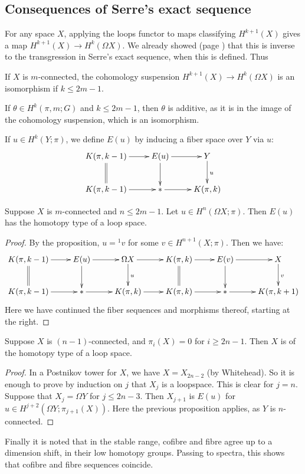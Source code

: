 \documentclass[11pt]{article}
\begin{document}
\subsection{Consequences of Serre's exact sequence}
For any space $X$, applying the loops functor to maps classifying $H^{k+1}(X)$
gives a map $H^{k+1}(X)\to H^{k}(\Omega X)$. We already showed (page
\pageref{cohSusp}) that this is inverse to the transgression in Serre's exact
sequence, when this is defined. Thus
\begin{prop*}
If $X$ is $m$-connected, the cohomology suspension 
$H^{k+1}(X)\to H^{k}(\Omega X)$ is an isomorphism if $k\leq 2m-1$.
\end{prop*}
\begin{cor*}
If $\theta\in H^k(\pi,m;G)$ and $k\leq2m-1$, then $\theta$ is additive, as it is
in the image of the cohomology suspension, which is an isomorphism.
\end{cor*}
If $u\in H^k(Y;\pi)$, we define $E(u)$ by inducing a fiber space over $Y$ via
$u$:
\[\xymatrix{
K(\pi,k-1)\ar[r]\ar@{=}[d]&E(u)\ar[r]\ar[d]&Y\ar[d]^u\\
K(\pi,k-1)\ar[r]&{*}\ar[r]&K(\pi,k)
}\]
\begin{prop*}
Suppose $X$ is $m$-connected and $n\leq 2m-1$. Let $u\in H^n(\Omega X;\pi)$.
Then $E(u)$ has the homotopy type of a loop space.
\end{prop*}
\begin{proof}
By the proposition, $u={^1v}$ for some $v\in H^{n+1}(X;\pi)$. Then we have:
\[\xymatrix{
K(\pi,k-1)\ar[r]\ar@{=}[d]&E(u)\ar[r]\ar[d]&\Omega X\ar[d]^u\ar[r]&
K(\pi,k)\ar[r]\ar@{=}[d]&E(v)\ar[r]\ar[d]&X\ar[d]^v\\
K(\pi,k-1)\ar[r]&{*}\ar[r]&K(\pi,k)\ar[r]&
K(\pi,k)\ar[r]&{*}\ar[r]&K(\pi,k+1)
}\]
Here we have continued the fiber sequences and morphisms thereof, starting at
the right.
\end{proof}
\begin{cor*}
Suppose $X$ is $(n-1)$-connected, and $\pi_i(X)=0$ for $i\geq 2n-1$. Then $X$ is
of the homotopy type of a loop space.
\end{cor*}
\begin{proof}
In a Postnikov tower for $X$, we have $X=X_{2n-2}$ (by Whitehead). So it is
enough to prove by induction on $j$ that $X_{j}$ is a loopspace. This is clear
for $j=n$. Suppose that $X_{j}=\Omega Y$ for $j\leq 2n-3$. Then $X_{j+1}$ is
$E(u)$ for $u\in H^{j+2}(\Omega Y;\pi_{j+1}(X))$. Here the previous proposition
applies, as $Y$ is $n$-connected.
\end{proof}
Finally it is noted that in the stable range, cofibre and fibre agree up to a
dimension shift, in their low homotopy groups. Passing to spectra, this shows
that cofibre and fibre sequences coincide.
\end{document}
